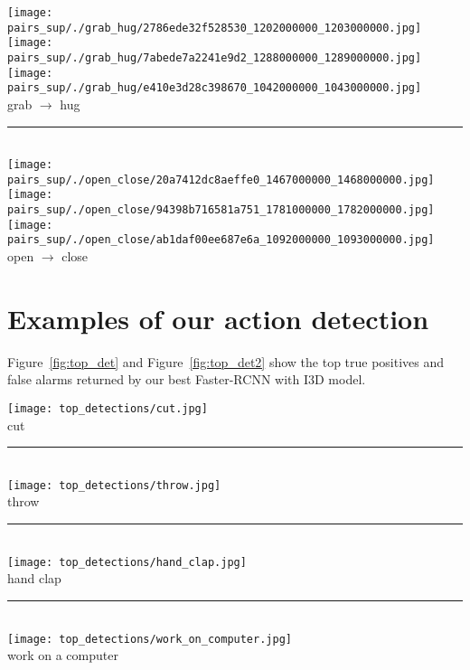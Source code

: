 \documentclass[10pt,twocolumn,letterpaper]{article}
\begin{document}
\begin{figure*}[t]
\texttt{[image: pairs\_sup/./grab\_hug/2786ede32f528530\_1202000000\_1203000000.jpg]}\hfill
\texttt{[image: pairs\_sup/./grab\_hug/7abede7a2241e9d2\_1288000000\_1289000000.jpg]}\hfill
\texttt{[image: pairs\_sup/./grab\_hug/e410e3d28c398670\_1042000000\_1043000000.jpg]}
\\
grab $\rightarrow$ hug
\noindent\rule{\textwidth}{1pt}\\[1em]
\texttt{[image: pairs\_sup/./open\_close/20a7412dc8aeffe0\_1467000000\_1468000000.jpg]}\hfill
\texttt{[image: pairs\_sup/./open\_close/94398b716581a751\_1781000000\_1782000000.jpg]}\hfill
\texttt{[image: pairs\_sup/./open\_close/ab1daf00ee687e6a\_1092000000\_1093000000.jpg]}
\\
open $\rightarrow$ close\\[1em]
\caption{We show more examples of how atomic actions change over time in AVA. The text shows pairs of atomic actions for the people in \textcolor{red}{red} bounding boxes.}
\label{fig:pairs}
\end{figure*}

\section{Examples of our action detection}

Figure~\ref{fig:top_det} and Figure~\ref{fig:top_det2} show the top true positives and false alarms returned by our best Faster-RCNN with I3D model.



\begin{figure*}[t]
\centering
\texttt{[image: top\_detections/cut.jpg]}
\\
cut
\\
\noindent\rule{.85\textwidth}{1pt}\\[1em]
\texttt{[image: top\_detections/throw.jpg]}
\\
throw
\\
\noindent\rule{.85\textwidth}{1pt}\\[1em]
\texttt{[image: top\_detections/hand\_clap.jpg]}
\\
hand clap
\\
\noindent\rule{.85\textwidth}{1pt}\\[1em]
\texttt{[image: top\_detections/work\_on\_computer.jpg]}
\\
work on a computer
\\
\caption{Most confident action detections on AVA. True positives are in green, false alarms in red.}
\label{fig:top_det}
\end{figure*}
\end{document}

